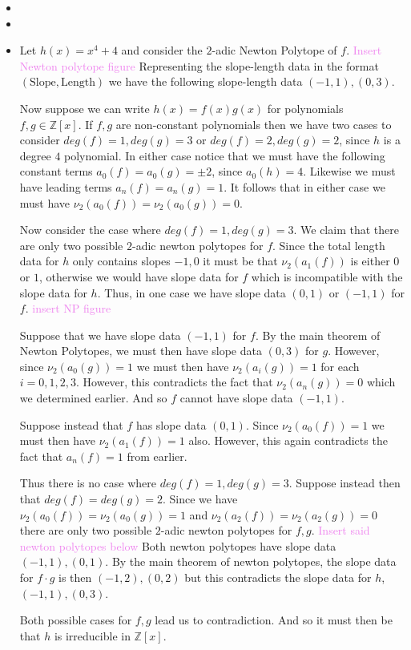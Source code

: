 \documentclass[12pt,letterpaper,boxed]{hmcpset}
\newcommand{\wg}[1]{\textcolor{violet}{#1}}
\newcommand{\Z}{\mathbb Z}
\begin{document}
\begin{solution}
\begin{itemize}
\item 
\item
\item Let $h(x) = x^4 + 4$ and consider the $2$-adic Newton Polytope
of $f$. 
\wg{Insert Newton polytope figure}
Representing the slope-length data in the format $(\text{Slope},
\text{Length})$ we have the following slope-length data $(-1, 1),
(0,3)$. 

Now suppose we can write $h(x) = f(x)g(x)$ for polynomials $f,g \in
\Z[x]$. If $f,g$ are non-constant polynomials then we have two cases
to consider $deg(f) = 1, deg(g) = 3$ or $deg(f) = 2, deg(g) = 2$,
since $h$ is a degree $4$ polynomial. In either case notice that we
must have the following constant terms $a_0(f) = a_0(g) = \pm 2$,
since $a_0(h) = 4$. Likewise we must have leading terms $a_n(f) =
a_n(g) = 1$. It follows that in either case we must have $\nu_2(a_0(f)) =
\nu_2(a_0(g)) = 0$. 

Now consider the case where $deg(f) = 1, deg(g) = 3$.
We claim that there are only two possible $2$-adic newton polytopes
for $f$. Since the total length data for $h$ only contains slopes
$-1,0$ it must be that $\nu_2(a_1(f))$ is either $0$ or $1$, otherwise
we would have slope data for $f$ which is incompatible with the slope
data for $h$.
Thus, in one case we have slope data $(0,1)$ or $(-1,1)$ for $f$. 
\wg{insert NP figure}

Suppose that we have slope data $(-1,1)$ for $f$. 
By the main theorem of Newton Polytopes, we must then have slope
data $(0,3)$ for $g$. However, since $\nu_2(a_0(g)) = 1$ we must then
have $\nu_2(a_i(g)) = 1$ for each $i=0,1,2,3$. However, this
contradicts the fact that $\nu_2(a_n(g)) = 0$ which we determined
earlier. And so $f$ cannot have slope data $(-1,1)$.

Suppose instead that $f$ has slope data $(0,1)$. Since $\nu_2(a_0(f))
= 1$ we must then have $\nu_2(a_1(f)) = 1$ also. However, this again
contradicts the fact that $a_n(f) = 1$ from earlier.

Thus there is no case where $deg(f) = 1, deg(g) = 3$. Suppose instead
then that $deg(f) = deg(g) = 2$. Since we have $\nu_2(a_0(f)) =
\nu_2(a_0(g)) = 1$ and $\nu_2(a_2(f)) = \nu_2(a_2(g)) = 0$ there are
only two possible $2$-adic newton polytopes for $f,g$.
\wg{Insert said newton polytopes below}
Both newton polytopes have slope data $(-1,1),(0,1)$. By the main
theorem of newton polytopes, the slope data for $f\cdot g$ is then 
$(-1, 2), (0,2)$ but this contradicts the slope data for $h$, $(-1,1),
(0,3)$.

Both possible cases for $f,g$ lead us to contradiction. And so it must
then be that $h$ is irreducible in $\Z[x]$. 



\end{itemize}
\end{solution}

\newpage


\begin{problem}[4]
	\hfill
\end{problem}

\begin{solution}
\end{solution}

\newpage
\end{document}
